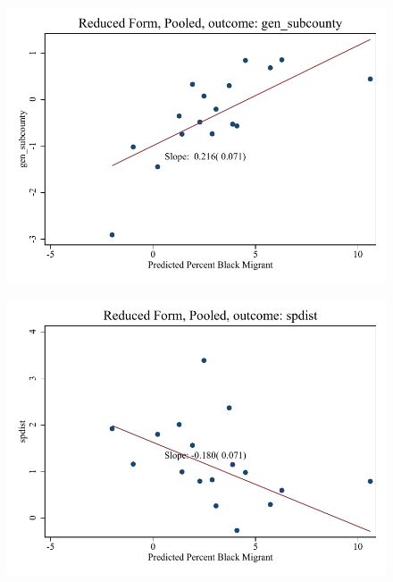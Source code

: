 \documentclass{article}
\begin{document}
\clearpage
\begin{figure}
	\centering
	\includegraphics[width=.8\textwidth]{figures/binscatter/pooled_gen_subcounty_rf_percent.pdf}
\end{figure}
\clearpage
\begin{figure}
	\centering
	\includegraphics[width=.8\textwidth]{figures/binscatter/pooled_spdist_rf_percent.pdf}
\end{figure}
\clearpage
\end{document}
